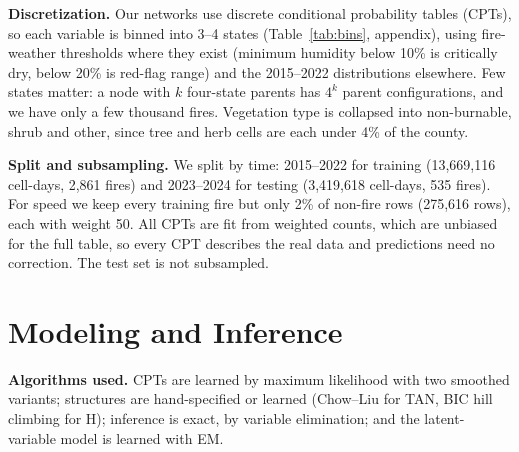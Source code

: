 \documentclass[11pt]{article}
\begin{document}
\textbf{Discretization.} Our networks use discrete conditional probability tables (CPTs), so each
variable is binned into 3--4 states (Table~\ref{tab:bins}, appendix), using fire-weather thresholds
where they exist (minimum humidity below 10\% is critically dry, below 20\% is red-flag range) and
the 2015--2022 distributions elsewhere. Few states matter: a node with $k$ four-state parents has
$4^k$ parent configurations, and we have only a few thousand fires. Vegetation type is collapsed
into non-burnable, shrub and other, since tree and herb cells are each under 4\% of the county.

\textbf{Split and subsampling.} We split by time: 2015--2022 for training (13,669,116 cell-days,
2,861 fires) and 2023--2024 for testing (3,419,618 cell-days, 535 fires). For speed we keep every
training fire but only 2\% of non-fire rows (275,616 rows), each with weight 50. All CPTs are fit
from weighted counts, which are unbiased for the full table, so every CPT describes the real data
and predictions need no correction. The test set is not subsampled.

\section{Modeling and Inference}

\textbf{Algorithms used.} CPTs are learned by maximum likelihood with two smoothed variants;
structures are hand-specified or learned (Chow--Liu for TAN, BIC hill climbing for H); inference
is exact, by variable elimination; and the latent-variable model is learned with EM.
\end{document}
